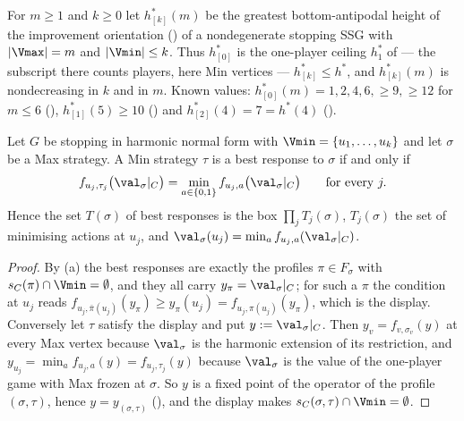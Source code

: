 
\begin{definition}\label{mb:budget}
For $m\ge1$ and $k\ge0$ let $h^{\ast}_{[k]}(m)$ be the greatest
bottom-antipodal height of the improvement orientation
() of a nondegenerate stopping SSG with
$|\Vmax|=m$ and $|\Vmin|\le k$. Thus $h^{\ast}_{[0]}$ is the one-player
ceiling $h^{\ast}_{1}$ of  --- the subscript there
counts players, here Min vertices --- $h^{\ast}_{[k]}\le h^{\ast}$, and
$h^{\ast}_{[k]}(m)$ is nondecreasing in $k$ and in $m$. Known values:
$h^{\ast}_{[0]}(m)=1,2,4,6,\ge9,\ge12$ for $m\le6$
(), $h^{\ast}_{[1]}(5)\ge10$
() and $h^{\ast}_{[2]}(4)=7=h^{\ast}(4)$
().
\end{definition}

\begin{lemma}\label{mb:greedy-box}
Let $G$ be stopping in harmonic normal form with
$\Vmin=\{u_1,\dots,u_k\}$ and let $\sigma$ be a Max strategy. A Min
strategy $\tau$ is a best response to $\sigma$ if and only if
\[
  f_{u_j,\tau_j}\bigl(\val_\sigma|_C\bigr)
  =\min_{a\in\{0,1\}}f_{u_j,a}\bigl(\val_\sigma|_C\bigr)
  \qquad\text{for every }j .
\]
Hence the set $T(\sigma)$ of best responses is the box
$\prod_jT_j(\sigma)$, $T_j(\sigma)$ the set of minimising actions at
$u_j$, and $\val_\sigma(u_j)=\min_af_{u_j,a}(\val_\sigma|_C)$.
\end{lemma}

\begin{proof}
By (a) the best responses are exactly the profiles
$\pi\in F_\sigma$ with $s_C(\pi)\cap\Vmin=\emptyset$, and they all carry
$y_\pi=\val_\sigma|_C$; for such a $\pi$ the condition at $u_j$ reads
$f_{u_j,\bar\pi(u_j)}(y_\pi)\ge y_\pi(u_j)=f_{u_j,\pi(u_j)}(y_\pi)$,
which is the display. Conversely let $\tau$ satisfy the display and put
$y:=\val_\sigma|_C$. Then $y_v=f_{v,\sigma_v}(y)$ at every Max vertex
because $\val_\sigma$ is the harmonic extension of its restriction, and
$y_{u_j}=\min_af_{u_j,a}(y)=f_{u_j,\tau_j}(y)$ because $\val_\sigma$ is
the value of the one-player game with Max frozen at $\sigma$. So $y$ is a
fixed point of the operator of the profile $(\sigma,\tau)$, hence
$y=y_{(\sigma,\tau)}$ (), and the display makes
$s_C(\sigma,\tau)\cap\Vmin=\emptyset$.
\end{proof}

